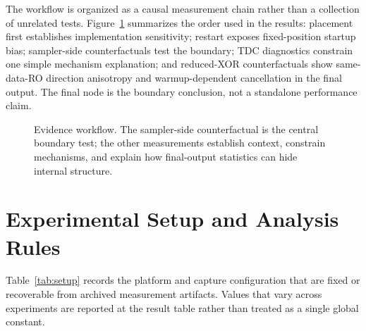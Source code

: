\documentclass[journal]{IEEEtran}
\newcommand{\tdc}{TDC}
\begin{document}
The workflow is organized as a causal measurement chain rather than a collection of unrelated tests. Figure~\ref{fig:workflow} summarizes the order used in the results: placement first establishes implementation sensitivity; restart exposes fixed-position startup bias; sampler-side counterfactuals test the boundary; \tdc{} diagnostics constrain one simple mechanism explanation; and reduced-XOR counterfactuals show same-data-RO direction anisotropy and warmup-dependent cancellation in the final output. The final node is the boundary conclusion, not a standalone performance claim.

\begin{figure}[t]
\centering
{}
\caption{Evidence workflow. The sampler-side counterfactual is the central boundary test; the other measurements establish context, constrain mechanisms, and explain how final-output statistics can hide internal structure.}
\label{fig:workflow}
\end{figure}

\section{Experimental Setup and Analysis Rules}

Table~\ref{tab:setup} records the platform and capture configuration that are fixed or recoverable from archived measurement artifacts. Values that vary across experiments are reported at the result table rather than treated as a single global constant.
\end{document}
